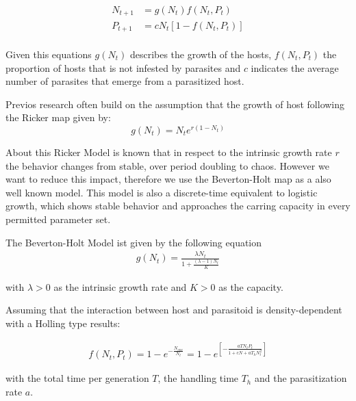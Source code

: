 \documentclass[a4paper,12pt, twoside]{article} %
\begin{document}
\begin{equation}
\begin{split}
  N_{t+1} &= g(N_t)  f(N_t,P_t) \\
  P_{t+1} &= c N_t[1- f(N_t, P_t)] \\
\end{split}
\end{equation}

Given this equations $g(N_t)$ describes the growth of the hosts, $f(N_t, P_t)$ the proportion of hosts
that is not infested by parasites and $c$ indicates the average number of parasites that emerge from 
a parasitized host.

Previos research often build on the assumption that the growth of host following the Ricker map given
by:
\begin{equation}
  g(N_t)= N_t e^{r(1-N_t)}
\end{equation}

About this Ricker Model is known that in respect to the intrinsic growth rate $r$ the behavior changes 
from stable, over period doubling to chaos.  However we want to reduce this impact, therefore we use 
the Beverton-Holt map as a also well known model. This model is also a discrete-time equivalent to 
logistic growth, which shows stable behavior and approaches the carring capacity in every permitted parameter set. 

The Beverton-Holt Model ist given by the following equation
\begin{equation}
  \begin{split}
    g(N_t) = \frac{\lambda N_t}{1 + \frac{(\lambda -1)N_t}{K}}
  \end{split}
\end{equation}

with $\lambda > 0$ as the intrinsic growth rate and $K > 0$ as the capacity.

Assuming that the interaction between host and parasitoid is density-dependent with a Holling type
 results:

\begin{equation}
  \begin{split}
    f(N_t, P_t) = 1 - e^{- \frac{N_{enc}}{N_t}} =1- e^{\left[- \frac{aTN_t P_t}{1+cN+aT_h N_t^2} \right]} 
  \end{split}
\end{equation}

with the total time per generation $T$, the handling time $T_h$ and the parasitization rate $a$.
\end{document}
